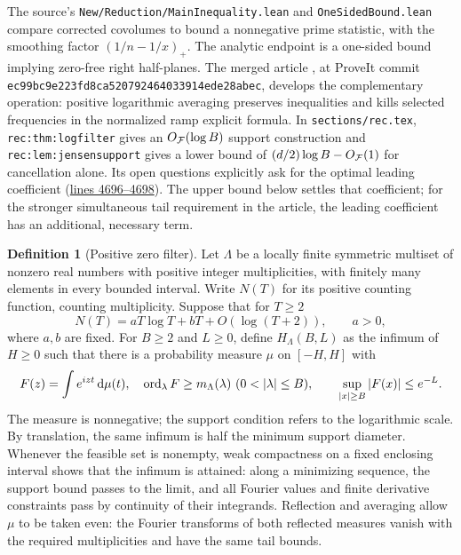 \documentclass[11pt]{article}
\theoremstyle{definition}\newtheorem{definition}[theorem]{Definition}
\newcommand{\repobase}{https://github.com/VladimirReshetnikov/ProveIt/blob/ec99bc9e223fd8ca520792464033914ede28abec/Analysis/GeneralizedRiemannHypothesis}
\begin{document}
The source's \texttt{New/Reduction/MainInequality.lean} and \texttt{OneSidedBound.lean} compare corrected covolumes to bound a nonnegative prime statistic, with the smoothing factor $(1/n-1/x)_+$. The analytic endpoint is a one-sided bound implying zero-free right half-planes. The merged article \cite{article}, at ProveIt commit \texttt{ec99bc9e223fd8ca520792464033914ede28abec}, develops the complementary operation: positive logarithmic averaging preserves inequalities and kills selected frequencies in the normalized ramp explicit formula. In \texttt{sections/rec.tex}, \texttt{rec:thm:logfilter} gives an $O_{\mathcal F}(\log B)$ support construction and \texttt{rec:lem:jensensupport} gives a lower bound of $(d/2)\log B-O_{\mathcal F}(1)$ for cancellation alone. Its open questions explicitly ask for the optimal leading coefficient (\href{\repobase/Article/sections/rec.tex\#L4696-L4698}{lines 4696--4698}). The upper bound below settles that coefficient; for the stronger simultaneous tail requirement in the article, the leading coefficient has an additional, necessary term.

\begin{definition}[Positive zero filter]\label{def:filter}
Let $\Lambda$ be a locally finite symmetric multiset of nonzero real numbers with positive integer multiplicities, with finitely many elements in every bounded interval. Write $N(T)$ for its positive counting function, counting multiplicity. Suppose that for $T\ge2$
\begin{equation}\label{eq:count}
 N(T)=aT\log T+bT+O(\log(T+2)),\qquad a>0,
\end{equation}
where $a,b$ are fixed. For $B\ge2$ and $L\ge0$, define $H_\Lambda(B,L)$ as the infimum of $H\ge0$ such that there is a probability measure $\mu$ on $[-H,H]$ with
\begin{equation}\label{eq:constraints}
 F(z)=\int e^{izt}\dd\mu(t),\quad \ord_\lambda F\ge m_\Lambda(\lambda)\ (0<|\lambda|\le B),\qquad \sup_{|x|\ge B}|F(x)|\le e^{-L}.
\end{equation}
The measure is nonnegative; the support condition refers to the logarithmic scale. By translation, the same infimum is half the minimum support diameter. Whenever the feasible set is nonempty, weak compactness on a fixed enclosing interval shows that the infimum is attained: along a minimizing sequence, the support bound passes to the limit, and all Fourier values and finite derivative constraints pass by continuity of their integrands. Reflection and averaging allow $\mu$ to be taken even: the Fourier transforms of both reflected measures vanish with the required multiplicities and have the same tail bounds.
\end{definition}
\end{document}
